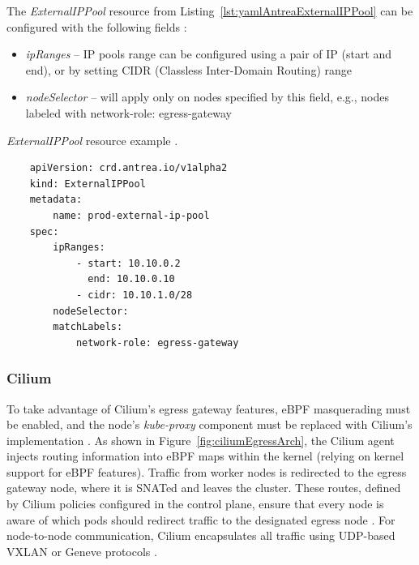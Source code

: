 The \textit{ExternalIPPool} resource from Listing~\ref{lst:yamlAntreaExternalIPPool} can be configured with the following fields \cite{AntreaDocs}:

\begin{itemize}
    \item \textit{ipRanges} -- IP pools range can be configured using a pair of IP (start and end), or by setting CIDR (Classless Inter-Domain Routing) range
    \item \textit{nodeSelector} -- will apply only on nodes specified by this field, e.g., nodes labeled with network-role: egress-gateway
\end{itemize}

\begin{listing}[htb]
    \centering
    \caption{\textit{ExternalIPPool} resource example \cite{AntreaDocs}.}
    \begin{verbatim}
    apiVersion: crd.antrea.io/v1alpha2
    kind: ExternalIPPool
    metadata:
        name: prod-external-ip-pool
    spec:
        ipRanges:
            - start: 10.10.0.2
              end: 10.10.0.10
            - cidr: 10.10.1.0/28
        nodeSelector:
        matchLabels:
            network-role: egress-gateway
    \end{verbatim}
    \label{lst:yamlAntreaExternalIPPool}
\end{listing}
  


\subsubsection{Cilium}
\label{subsection:ciliumEgress}

To take advantage of Cilium's egress gateway features, eBPF masquerading must be enabled, and the node's \textit{kube-proxy} component must be replaced with Cilium's implementation \cite{CiliumDocs}. As shown in Figure~\ref{fig:ciliumEgressArch}, the Cilium agent injects routing information into eBPF maps within the kernel (relying on kernel support for eBPF features). Traffic from worker nodes is redirected to the egress gateway node, where it is SNATed and leaves the cluster. These routes, defined by Cilium policies configured in the control plane, ensure that every node is aware of which pods should redirect traffic to the designated egress node \cite{CiliumDocs}. For node-to-node communication, Cilium encapsulates all traffic using UDP-based VXLAN or Geneve protocols \cite{CiliumDocs}.

